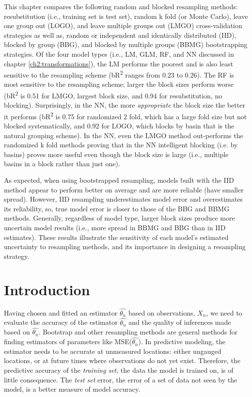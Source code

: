 This chapter compares the following random and blocked resampling methods: resubstitution (i.e., training set is test set), random k fold  (or Monte Carlo), leave one group out (LOGO), and leave multiple groups out (LMGO) cross-validation strategies as well as, random or independent and identically distributed (IID), blocked by group (BBG), and blocked by multiple groups (BBMG) bootstrapping strategies. Of the four model types (i.e., LM, GLM, RF, and NN discussed in chapter \ref{ch2:transformations}), the LM performs the poorest and is also least sensitive to the resampling scheme (bR\textsuperscript{2} ranges from 0.23 to 0.26). The RF is most sensitive to the resampling scheme; larger the block sizes perform worse (bR\textsuperscript{2} is 0.51 for LMGO, largest block size, and 0.94 for resubstitution, no blocking). Surprisingly, in the NN, the more \textit{appropriate} the block size the better it performs (bR\textsuperscript{2} is 0.75 for randomized 2 fold, which has a large fold size but not blocked systematically, and 0.92 for LOGO, which blocks by basin that is the natural grouping scheme). In the NN, even the LMGO method out-performs the randomized k fold methods proving that in the NN intelligent blocking (i.e. by basins) proves more useful even though the block size is large (i.e., multiple basins in a block rather than just one). 

As expected, when using bootstrapped resampling, models built with the IID method appear to perform better on average and are more reliable (have smaller spread). However, IID resampling underestimates model error and overestimates its reliability, so, true model error is closer to those of the BBG and BBMG methods. Generally, regardless of model type, larger block sizes produce more uncertain model results (i.e., more spread in BBMG and BBG than in IID estimates). These results illustrate the sensitivity of each model's estimated uncertainty to resampling methods, and its importance in designing a resampling strategy. 

\section{Introduction} \label{ch5:introduction}
Having chosen and fitted an estimator $\hat{\theta_n}$ based on observations, $X_n$, we need to evaluate the accuracy of the estimator $\hat{\theta_n}$ and the quality of inferences made based on $\hat{\theta_n}$. Bootstrap and other resampling methods are general methods for finding estimators of parameters like MSE($\hat{\theta_n}$). In predictive modeling, the estimator needs to be accurate at unmeasured locations: either ungauged locations, or at future times where observations do not yet exist. Therefore, the predictive accuracy of the \textit{training set}, the data the model is trained on, is of little consequence. The \textit{test set} error, the error of a set of data not seen by the model, is a better measure of model accuracy. 

